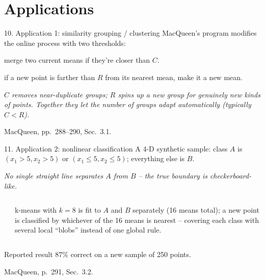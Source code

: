 \documentclass[10pt,compress]{beamer}
\newcommand{\defline}[1]{{\footnotesize\textcolor{aggiemaroon}{\textit{#1}}\par}}
\begin{document}
\section{Applications}

\begin{frame}{10. Application 1: similarity grouping / clustering}
MacQueen's program modifies the online process with two thresholds:
\begin{description}\small
\item[$C$ (coarsening):] merge two current means if they're closer than $C$.
\item[$R$ (refinement):] if a new point is farther than $R$ from its nearest mean, make it a new mean.
\end{description}
\defline{$C$ removes near-duplicate groups; $R$ spins up a new group for genuinely new kinds of points. Together they let the number of groups adapt automatically (typically $C<R$).}
\vfill
{\scriptsize MacQueen, pp.~288--290, Sec.~3.1.}
\end{frame}

\begin{frame}{11. Application 2: nonlinear classification}
A 4-D synthetic sample: class $A$ is $(x_1{>}5,x_2{>}5)$ or $(x_1{\le}5,x_2{\le}5)$; everything else is $B$.
\defline{No single straight line separates $A$ from $B$ -- the true boundary is checkerboard-like.}
\begin{columns}[T]
\begin{center}
\end{center}
\footnotesize k-means with $k=8$ is fit to $A$ and $B$ separately (16 means total); a new point is classified by whichever of the 16 means is nearest -- covering each class with several local ``blobs'' instead of one global rule.
\end{columns}
\begin{block}{\footnotesize Reported result}
\small 87\% correct on a new sample of 250 points.
\end{block}
\vfill
{\scriptsize MacQueen, p.~291, Sec.~3.2.}
\end{frame}
\end{document}
